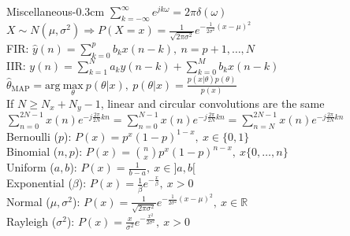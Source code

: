 \documentclass[10pt,3col]{cheatsheet}
\begin{document}
\begin{multicols*}{3}
\begin{cheatsheetbox}{Miscellaneous}{-0.3cm}
    $\sum_{k = -\infty}^{\infty} e^{jk\omega} = 2\pi \delta(\omega)$\\
    $X \sim N(\mu, \sigma^2) \Rightarrow P(X = x) = \frac{1}{\sqrt{2\pi \sigma^2}} e^{-\frac{1}{2\sigma^2} (x - \mu)^2}$\\
    FIR: $\hat{y}(n) = \sum_{k = 0}^p b_k x(n - k), \ n = p+1, \dots, N$\\
    IIR: $y(n) = \sum_{k = 1}^N a_k y(n - k) + \sum_{k = 0}^M b_k x(n - k)$\\
    $\hat{\theta}_\mathrm{MAP} = \mathrm{arg} \ \underset{\theta}{\mathrm{max}} \ p(\theta |x), \ p(\theta |x) = \frac{p(x|\theta) p(\theta)}{p(x)}$\\
    If $N \geq N_x + N_y - 1$, linear and circular convolutions are the same\\
    $\displaystyle \sum_{n = 0}^{2N-1}x(n) e^{-j\frac{2\pi}{2N}kn} = \sum_{n = 0}^{N-1}x(n) e^{-j\frac{2\pi}{2N}kn} = \sum_{n = N}^{2N-1}x(n) e^{-j\frac{2\pi}{2N}kn}$\\
    Bernoulli ($p$): $P(x) = p^x(1 - p)^{1 - x}, \ x \in \{0, 1\}$\\
    Binomial ($n, p$): $P(x) = \binom{n}{x} p^x(1 - p)^{n - x}, \ x \{0,\dots, n\}$\\
    Uniform ($a, b$): $P(x) = \frac{1}{b - a}, \ x \in ]a, b[$\\
    Exponential ($\beta$): $P(x) = \frac{1}{\beta} e^{-\frac{x}{\beta}}, \ x > 0$\\
    Normal ($\mu, \sigma^2$): $P(x) = \frac{1}{\sqrt{2\pi\sigma^2}}e^{-\frac{1}{2\sigma^2}(x - \mu)^2}, \ x \in \mathbb{R}$\\
    Rayleigh ($\sigma^2$): $P(x) = \frac{x}{\sigma^2}e^{-\frac{x^2}{2\sigma^2}}, \ x > 0$
\end{cheatsheetbox}

\makefooter
\end{multicols*}
\end{document}
